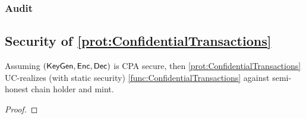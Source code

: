 \subsubsection{Audit} 



\subsection{Security of \cref{prot:ConfidentialTransactions}}
\begin{theorem}\label{thm:ConfidentialTransactions}
Assuming  $(\mathsf{KeyGen},\mathsf{Enc},\mathsf{Dec})$ is CPA secure, then \cref{prot:ConfidentialTransactions} UC-realizes (with static security) \cref{func:ConfidentialTransactions} against semi-honest chain holder and mint.
\end{theorem}

\begin{proof}
\end{proof}

